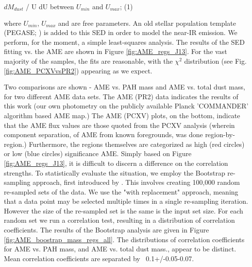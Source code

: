 \documentclass[preprint2,longabstract]{aastex}
\begin{document}
     $dM_{dust}$ / U dU between $U_{min}$ and $U_{max}$; (1)

where $U_{min}$, $U_{max}$ and  are free parameters. An old stellar population template (PEGASE; \citep{fioc97}) is added to this SED in order to model the near-IR emission. We perform, for the moment, a simple least-squares analysis. The results of the SED fitting vs. the AME are shown in Figure \ref{fig:AME_regs_J13}. For the vast majority of the samples, the fits are reasonable, with the $\chi^{2}$ distribution (see Fig. \ref{fig:AME_PCXVvsPR2}) appearing as we expect.

     Two comparisons are shown - AME vs. PAH mass and AME vs. total dust mass, for two different AME data sets. The AME (PR2) data indicates the results of this work (our own photometry on the publicly available Planck 'COMMANDER' algorithm based AME map.) The AME (PCXV) plots, on the bottom, indicate that the AME flux values are those quoted from the PCXV analysis (wherein component separation, of AME from known foregrounds, was done region-by-region.) Furthermore, the regions themselves are categorized as high (red circles) or low (blue circles) significance AME. Simply based on Figure \ref{fig:AME_regs_J13}, it is difficult to discern a difference on the correlation strengths. To statistically evaluate the situation, we employ the Bootstrap re-sampling approach, first introduced by \cite{efron79}. This involves creating 100,000 random re-sampled sets of the data. We use the "with replacement" approach, meaning that a data point may be selected multiple times in a single re-sampling iteration. However the size of the re-sampled set is the same is the input set size. For each random set we run a correlation test, resulting in a distribution of correlation coefficients. The results of the Bootstrap analysis are given in Figure \ref{fig:AME_boostrap_mass_regs_all}. The distributions of correlation coefficients for AME vs. PAH mass, and AME vs. total dust mass., appear to be distinct. Mean correlation coefficients are separated by ~0.1+/-0.05-0.07.

\end{document}
